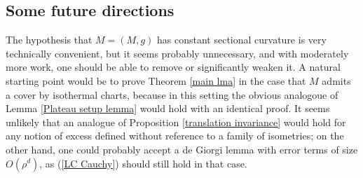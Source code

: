 \documentclass[reqno,10pt]{amsart}
\newcommand{\Hyp}{\mathbf H}
\newcommand*\dif{\mathop{}\!\mathrm{d}}
\newtheorem{proposition}[theorem]{Proposition}
\newtheorem{corollary}[theorem]{Corollary}
\theoremstyle{definition}
\numberwithin{equation}{section}
\begin{document}



\subsection{Some future directions}\label{open problems}
The hypothesis that $M = (M, g)$ has constant sectional curvature is very technically convenient, but it seems probably unnecessary, and with moderately more work, one should be able to remove or significantly weaken it.
A natural starting point would be to prove Theorem \ref{main lma} in the case that $M$ admits a cover by isothermal charts, because in this setting the obvious analogoue of Lemma \ref{Plateau setup lemma} would hold with an identical proof.
It seems unlikely that an analogue of Proposition \ref{translation invariance} would hold for any notion of excess defined without reference to a family of isometries; on the other hand, one could probably accept a de Giorgi lemma with error terms of size $O(\rho^d)$, as (\ref{LC Cauchy}) should still hold in that case.
\end{document}
